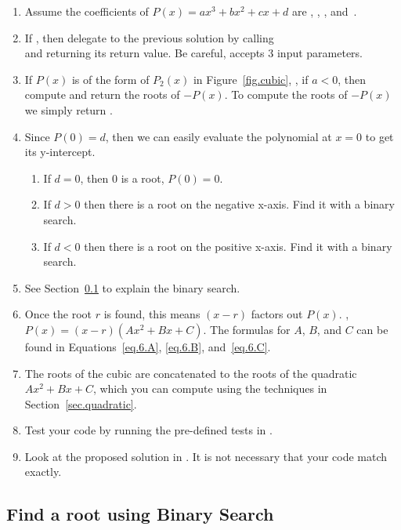 \begin{enumerate}
\item Assume the coefficients of $P(x) = a x^3 + b x^2 + c x + d$ are
  ,  ,  ,  and~.
\item If , then delegate to the previous solution by
  calling \\
   and returning its return
  value.  Be careful,  accepts 3 input
  parameters.
\item If $P(x)$ is of the form of $P_2(x)$ in Figure~\ref{fig.cubic},
  \ie, if $a<0$, then compute and return the roots of $-P(x)$.  To
  compute the roots of $-P(x)$ we simply return
  .
\item Since $P(0) = d$, then we can easily evaluate the polynomial at $x=0$ to get its y-intercept.
  \begin{enumerate}
  \item If $d = 0$, then 0 is a root, $P(0) = 0$.
  \item If $d>0$ then there is a root on the negative x-axis.  Find it with a binary search.
  \item If $d<0$ then there is a root on the positive x-axis. Find it with a binary search.
  \end{enumerate}
\item See Section~\ref{sec.binary.search} to explain the binary search.
\item Once the root $r$ is found, this means $(x-r)$ factors out $P(x)$. \Ie,
  ${P(x) = (x-r)(A x^2 + B x + C)}$.  The formulas for $A$, $B$, and $C$ can be found
  in Equations~\eqref{eq.6.A}, \eqref{eq.6.B}, and~\eqref{eq.6.C}.
\item The roots of the cubic are \code{[r]} concatenated to the roots of the quadratic 
  $A x^2 + B x + C$, which you can compute using the techniques in Section~\ref{sec.quadratic}.


\item Test your code by running the pre-defined tests in .

\item Look at the proposed solution in .  It is not necessary that your code match exactly.



\end{enumerate}


\subsection{Find a root using Binary Search}
\label{sec.binary.search}


